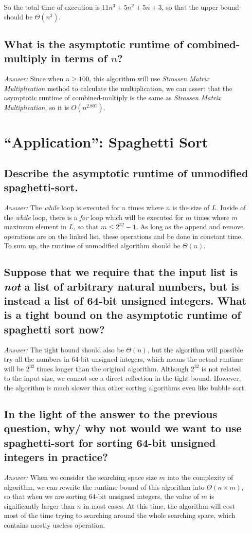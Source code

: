 \documentclass[11pt]{article}
\begin{document}
	So the total time of execution is $11n^3+5n^2+5n+3$, so that the upper bound should be $\Theta(n^3)$.
\subsection{What is the asymptotic runtime of combined-multiply in terms of $n$?}
	\emph{Answer:} Since when $n\geq100$, this algorithm will use \emph{Strassen Matrix Multiplication} method to calculate the multiplication, we can assert that the asymptotic runtime of combined-multiply is the same as \emph{Strassen Matrix Multiplication}, so it is $O(n^{2.807})$.
\section{``Application'': Spaghetti Sort}
\subsection{Describe the asymptotic runtime of unmodified spaghetti-sort.}
	\emph{Answer:} The \emph{while} loop is executed for $n$ times where $n$ is the size of $L$. Inside of the \emph{while} loop, there is a \emph{for} loop which will be executed for $m$ times where $m$ maximum element in $L$, so that $m\leq 2^32-1$. As long as the append and remove operations are on the linked list, these operations and be done in constant time. To sum up, the runtime of unmodified algorithm should be $\Theta(n)$.
\subsection{Suppose that we require that the input list is \emph{not} a list of arbitrary natural numbers, but is instead a list of 64-bit unsigned integers. What is a tight bound on the asymptotic runtime of spaghetti sort now?}
	\emph{Answer:} The tight bound should also be $\Theta(n)$, but the algorithm will possible try all the numbers in 64-bit unsigned integers, which means the actual runtime will be $2^{32}$ times longer than the original algorithm. Although $2^{32}$ is not related to the input size, we cannot see a direct reflection in the tight bound. However, the algorithm is much slower than other sorting algorithms even like bubble sort.
\subsection{In the light of the answer to the previous question, why/ why not would we want to use spaghetti-sort for sorting 64-bit unsigned integers in practice?}
	\emph{Answer:} When we consider the searching space size $m$ into the complexity of algorithm, we can rewrite the runtime bound of this algorithm into $\Theta(n\times m)$, so that when we are sorting 64-bit unsigned integers, the value of $m$ is significantly larger than $n$ in most cases. At this time, the algorithm will cost most of the time trying to searching around the whole searching space, which contains mostly useless operation.
\end{document}
